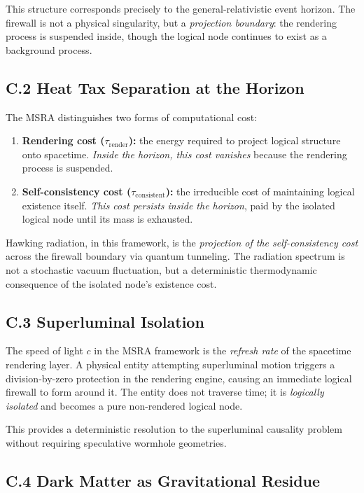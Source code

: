 \documentclass[11pt,a4paper]{article}
\begin{document}
This structure corresponds precisely to the general-relativistic event horizon. The firewall is not a physical singularity, but a {\it projection boundary}: the rendering process is suspended inside, though the logical node continues to exist as a background process.

\subsection*{C.2 Heat Tax Separation at the Horizon}

The MSRA distinguishes two forms of computational cost:

\begin{enumerate}
\item \textbf{Rendering cost ($\tau_{\text{render}}$):} the energy required to project logical structure onto spacetime. \textit{Inside the horizon, this cost vanishes} because the rendering process is suspended.
\item \textbf{Self-consistency cost ($\tau_{\text{consistent}}$):} the irreducible cost of maintaining logical existence itself. \textit{This cost persists inside the horizon}, paid by the isolated logical node until its mass is exhausted.
\end{enumerate}

Hawking radiation, in this framework, is the {\it projection of the self-consistency cost} across the firewall boundary via quantum tunneling. The radiation spectrum is not a stochastic vacuum fluctuation, but a deterministic thermodynamic consequence of the isolated node's existence cost.

\subsection*{C.3 Superluminal Isolation}

The speed of light $c$ in the MSRA framework is the {\it refresh rate} of the spacetime rendering layer. A physical entity attempting superluminal motion triggers a division-by-zero protection in the rendering engine, causing an immediate logical firewall to form around it. The entity does not traverse time; it is {\it logically isolated} and becomes a pure non-rendered logical node.

This provides a deterministic resolution to the superluminal causality problem without requiring speculative wormhole geometries.

\subsection*{C.4 Dark Matter as Gravitational Residue}
\end{document}
